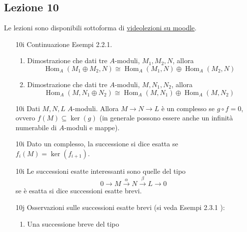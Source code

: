\documentclass[italian]{article}
\begin{document}
    \subsection{Lezione 10}

    Le lezioni sono disponibili sottoforma di 
    \href{https://didatticaonline.unitn.it/dol/course/view.php?id=23268}{videolezioni
    su moodle}.
    
    \begin{enumerate}
      \item[10i] Continuazione Esempi 2.2.1\cite{vergura}. 
        \begin{enumerate}
          \item Dimostrazione che dati tre $A$-moduli, $M_1, M_2, N$, allora 
            \begin{equation*}
                \operatorname{Hom}_A(M_1 \oplus M_2, N) \cong
                \operatorname{Hom}_A(M_1, N) \oplus  \operatorname{Hom}_A(M_2, N)
            \end{equation*}
          \item Dimostrazione che dati tre $A$-moduli, $M, N_1, N_2$, allora 
            \begin{equation*}
                \operatorname{Hom}_A(M, N_1 \oplus N_2) \cong
                \operatorname{Hom}_A(M, N_1) \oplus  \operatorname{Hom}_A(M, N_2)
            \end{equation*}
        \end{enumerate}
      \item[10i] Dati $M,N,L$ $A$-moduli. Allora $M \to N \to L$ è un complesso
        se $g \circ f = 0$, ovvero $f(M) \subseteq \ker(g)$ (in generale possono
        essere anche un infinità numerabile di $A$-moduli e mappe).  
      \item[10i] Dato un complesso, la successione si dice esatta se $f_i(M)
        = \ker(f_{i+1})$.
      \item[10i] Le successioni esatte interessanti sono quelle del tipo 
        \begin{equation}
          \label{eq:succ_esatta_brv}
          0 \to M \xrightarrow{\alpha} N \xrightarrow{\beta} L \to 0
        \end{equation}
        se è esatta si dice successioni esatte brevi.
      \item[10j] Osservazioni sulle successioni esatte brevi (si veda Esempi
        2.3.1 \cite{vergura}): 
        \begin{enumerate}
          \item Una successione breve del tipo 

\end{enumerate}
\end{enumerate}
\end{document}
